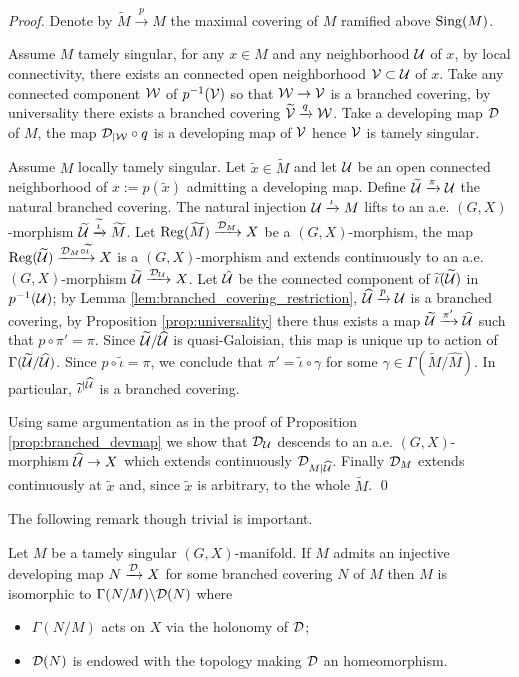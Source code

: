 \begin{proof} Denote by $\widetilde M \xrightarrow{p} M$ the maximal covering of $M$ ramified above $\mathrm{Sing}(M)$.


Assume $M$ tamely singular, for any $x\in M$ and any neighborhood $\mathcal{U}$ of $x$, by local connectivity, there exists an connected open neighborhood $\mathcal V\subset \mathcal{U}$  of $x$. Take any connected component $\mathcal W$ of $p^{-1}(\mathcal V)$ so that $\mathcal W\rightarrow \mathcal V $ is a branched covering, by universality there exists a branched covering $\widetilde {\mathcal V}\xrightarrow{q} \mathcal W$. Take a developing map $\mathcal{D}$ of $M$, the map $\mathcal{D}_{|\mathcal W}\circ q$ is a developing map of $\mathcal V$ hence $\mathcal V$ is tamely singular.

Assume $M$ locally tamely singular.
Let $\widetilde x\in \widetilde M$ and let $\mathcal{U}$ be an open connected neighborhood of $x:=p(\widetilde x)$ admitting a developing map. Define $\widetilde {\mathcal{U}} \xrightarrow{\pi} \mathcal{U}$ the natural branched covering. 
  The natural injection $\mathcal{U} \xrightarrow{\iota} M$ lifts to an a.e. $(G,X)$-morphism $\widetilde {\mathcal{U}}\xrightarrow{\widetilde \iota} \widetilde M$. 
  Let $\mathrm{Reg}(\widetilde M) \xrightarrow{\mathcal{D}_M} X$ be  a $(G,X)$-morphism,  the map $\mathrm{Reg}(\widetilde {\mathcal{U}}) \xrightarrow{\mathcal{D}_M\circ \widetilde \iota} X$ is a $(G,X)$-morphism and extends continuously to an a.e. $(G,X)$-morphism $\widetilde {\mathcal{U}}\xrightarrow{\mathcal{D}_{\mathcal{U}}} X$. Let $\hat {\mathcal{U}}$ be the connected component of $\widetilde \iota (\widetilde {\mathcal{U}})$ in $p^{-1}(\mathcal{U})$; by Lemma \ref{lem:branched_covering_restriction},  $\widehat {\mathcal{U}} \xrightarrow{p} \mathcal{U}$ is a branched covering, by Proposition \ref{prop:universality} there thus exists a  map $\widetilde {\mathcal{U}} \xrightarrow{\pi'} \widehat {\mathcal{U}}$  such that $p\circ \pi' = \pi $. Since $\widetilde {\mathcal{U}}/\widehat{\mathcal{U}}$ is quasi-Galoisian, this map is unique up to action of $\Gamma(\widetilde {\mathcal{U}}/\widehat {\mathcal{U}})$. Since $p \circ \widetilde \iota = \pi$, we conclude that $\pi' = \widetilde \iota \circ \gamma$ for some $\gamma \in \Gamma(\widetilde M/\widehat M)$. In particular, $\widetilde \iota^{|\widehat {\mathcal{U}}}$ is a branched covering.
  
  Using same argumentation as in the proof of Proposition \ref{prop:branched_devmap} we show that $\mathcal{D}_{\mathcal{U}}$ descends to an a.e. $(G,X)$-morphism  $\widehat {\mathcal{U}} \rightarrow X$ which extends continuously $\mathcal{D}_{M|\widehat {\mathcal{U}}}$.  Finally $\mathcal{D}_M$ extends continuously at $\widetilde x$ and, since $\widetilde x$ is arbitrary, to the whole $\widetilde M$.
 \qed\end{proof}
 
 The following remark though trivial is important.
 \begin{rem}\label{rem:tamely_singular_manifold_admits} Let $M$ be a tamely singular $(G,X)$-manifold. If $M$ admits an injective developing map $N\xrightarrow{\mathcal{D}}X$ for some branched covering $N$ of $M$ then $M$ is isomorphic to $\Gamma(N/M)\backslash\mathcal{D}(N)$ where 
 \begin{itemize}
  \item $\Gamma(N/M)$ acts on $X$ via the holonomy of $\mathcal{D}$;
  \item $\mathcal{D}(N)$ is endowed with the topology making  $\mathcal{D}$ an homeomorphism.
 \end{itemize} 
 \end{rem}


